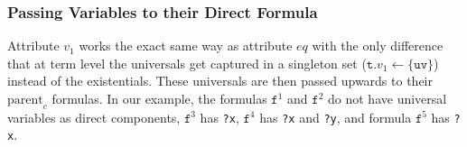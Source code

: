 \subsubsection*{Passing Variables to their Direct Formula}
Attribute $v_1$ works the exact same way as attribute $eq$ with the only difference that at term level the universals
get captured in a singleton set ($\texttt{t}.v_1\leftarrow\{\texttt{uv}\}$)  instead of the existentials. These universals are then passed upwards to their $\text{parent}_c$ formulas.
In our example, the formulas $\texttt{f}^1$ and $\texttt{f}^2$ do not have universal variables as direct components, $\texttt{f}^3$ has \texttt{?x}, $\texttt{f}^4$ has \texttt{?x} and \texttt{?y},
and 
formula $\texttt{f}^5$ has \texttt{?x}.
